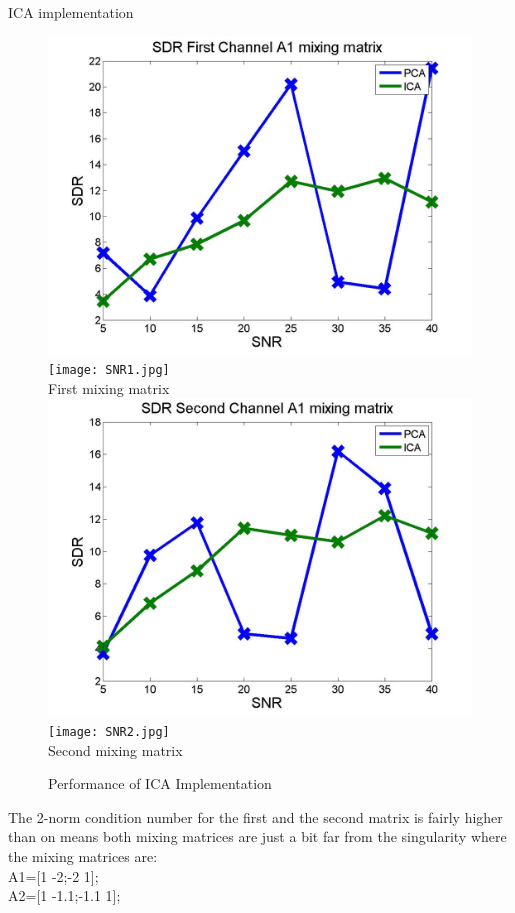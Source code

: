 \documentclass[t,12pt,english
\ifx\beamermode\undefined\else,\beamermode\fi
]{beamer}
\begin{document}
\begin{frame}{ICA implementation}

\begin{figure}[!htbp]
%
\centering
\includegraphics[width=.6\textwidth]{1.jpg}\\
\texttt{[image: SNR1.jpg]}\\
\tiny{First mixing matrix}\label{a1}
\endminipage\hfill
{}%
\centering
\includegraphics[width=.6\textwidth]{2.jpg}\\
\texttt{[image: SNR2.jpg]}\\
\tiny{Second mixing matrix}\label{a2}
\endminipage\hfill
\caption{\tiny Performance of ICA Implementation}
\end{figure}

\tiny{The 2-norm condition number for the first and the second matrix is fairly higher than on means both mixing matrices are just a bit far from the singularity where the mixing matrices are:\\
A1=[1 -2;-2 1];\\
A2=[1 -1.1;-1.1 1];}

\end{frame}
\end{document}
